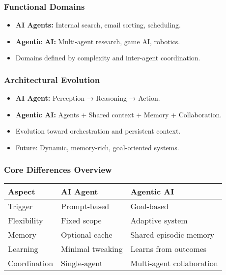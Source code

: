 \begin{frame}[fragile]\frametitle{Functional Domains}
    \begin{itemize}
        \item \textbf{AI Agents:} Internal search, email sorting, scheduling.
        \item \textbf{Agentic AI:} Multi-agent research, game AI, robotics.
        \item Domains defined by complexity and inter-agent coordination.
    \end{itemize}
\end{frame}

\begin{frame}[fragile]\frametitle{Architectural Evolution}
    \begin{itemize}
        \item \textbf{AI Agent:} Perception → Reasoning → Action.
        \item \textbf{Agentic AI:} Agents + Shared context + Memory + Collaboration.
        \item Evolution toward orchestration and persistent context.
        \item Future: Dynamic, memory-rich, goal-oriented systems.
    \end{itemize}
\end{frame}

\begin{frame}[fragile]\frametitle{Core Differences Overview}
\begin{tabular}{|l|l|l|}
\hline
\textbf{Aspect} & \textbf{AI Agent} & \textbf{Agentic AI} \\
\hline
Trigger & Prompt-based & Goal-based \\
Flexibility & Fixed scope & Adaptive system \\
Memory & Optional cache & Shared episodic memory \\
Learning & Minimal tweaking & Learns from outcomes \\
Coordination & Single-agent & Multi-agent collaboration \\
\hline
\end{tabular}
\end{frame}

